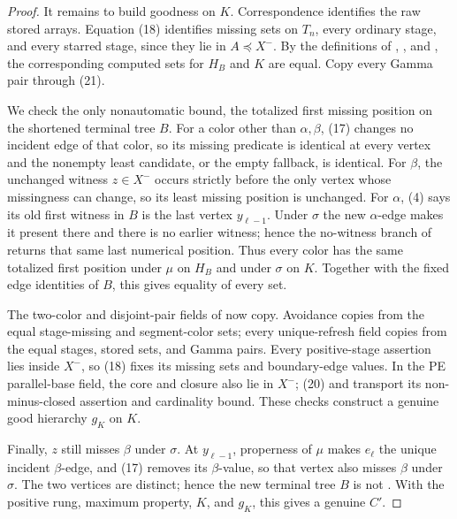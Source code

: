 \begin{proof}
It remains to build goodness on \(K\).  Correspondence identifies the raw
stored arrays.  Equation (18) identifies missing sets on \(T_n\), every
ordinary stage, and every starred stage, since they lie in
\(A\preccurlyeq X^-\).  By the definitions of
, , and
, the corresponding computed sets for
\(H_B\) and \(K\) are equal.  Copy every Gamma pair through (21).

We check the only nonautomatic bound, the totalized first missing position
on the shortened terminal tree \(B\).  For a color other than
\(\alpha,\beta\), (17) changes no incident edge of that color, so its
missing predicate is identical at every vertex and the nonempty least
candidate, or the empty fallback, is identical.  For \(\beta\), the
unchanged witness \(z\in X^-\) occurs strictly before the only vertex whose
missingness can change, so its least missing position is unchanged.  For
\(\alpha\), (4) says its old first witness in \(B\) is the last vertex
\(y_{\ell-1}\).  Under \(\sigma\) the new \(\alpha\)-edge makes it present
there and there is no earlier witness; hence the no-witness branch of
 returns that same last numerical
position.  Thus every color has the same totalized first position under
\(\mu\) on \(H_B\) and under \(\sigma\) on \(K\).  Together with the fixed
edge identities of \(B\), this gives equality of every
 set.

The two-color and disjoint-pair fields of  now copy.
Avoidance copies from the equal stage-missing and segment-color sets; every
unique-refresh field copies from the equal stages, stored sets, and Gamma
pairs.  Every positive-stage  assertion
lies inside \(X^-\), so (18) fixes its missing sets and boundary-edge
values.  In the PE parallel-base field, the core and closure also lie in
\(X^-\); (20) and  transport its
non-minus-closed assertion and cardinality bound.  These checks construct a
genuine good hierarchy \(g_K\) on \(K\).

Finally, \(z\) still misses \(\beta\) under \(\sigma\).  At
\(y_{\ell-1}\), properness of \(\mu\) makes \(e_\ell\) the unique incident
\(\beta\)-edge, and (17) removes its \(\beta\)-value, so that vertex also
misses \(\beta\) under \(\sigma\).  The two vertices are distinct; hence
the new terminal tree \(B\) is not
.  With the positive rung, maximum
property, \(K\), and \(g_K\), this gives a genuine
 \(C'\).


\end{proof}
